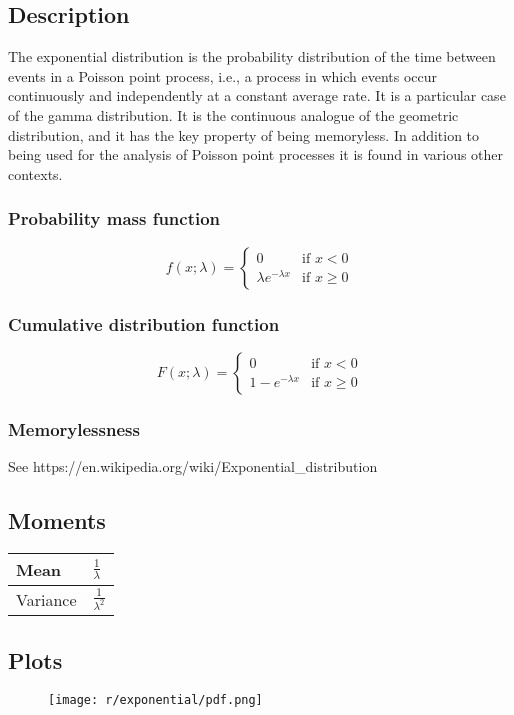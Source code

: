 \subsection{Description}
The exponential distribution is the probability distribution of the time between events in a Poisson point process, i.e., a process in which events occur continuously and independently at a constant average rate. It is a particular case of the gamma distribution. It is the continuous analogue of the geometric distribution, and it has the key property of being memoryless. In addition to being used for the analysis of Poisson point processes it is found in various other contexts.


\subsubsection{Probability mass function}
\[
	f(x; \lambda) =
	\begin{cases}
		0 & \text{if } x < 0 \\
		\lambda e^{-\lambda x} & \text{if } x \geq 0
	\end{cases}
\]

\subsubsection{Cumulative distribution function}
\[
	F(x; \lambda) =
	\begin{cases}
		0 & \text{if } x < 0 \\
		1 - e^{-\lambda x} & \text{if } x \geq 0
	\end{cases}
\]

\subsubsection{Memorylessness}
See https://en.wikipedia.org/wiki/Exponential\_distribution


\subsection{Moments}

\begin{tabular}{p{} p{}}
	\hline
	Mean & $\frac{1}{\lambda}$ \\\hline
	Variance & $\frac{1}{\lambda ^2}$\\\hline
\end{tabular}

\subsection{Plots}


\begin{figure}[H]
	\texttt{[image: r/exponential/pdf.png]}
\end{figure}
